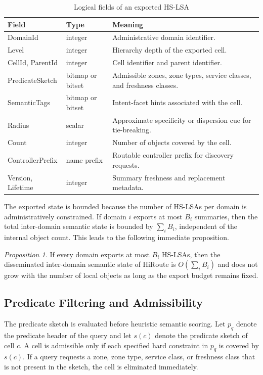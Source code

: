 \documentclass[journal]{IEEEtran}
\newcommand{\sysname}{HiRoute}
\newcommand{\hslsa}{HS-LSA}
\begin{document}
\begin{table}[t]
\caption{Logical fields of an exported \hslsa{}}
\label{tab:hslsa}
\centering
\begin{tabularx}{\columnwidth}{@{}>{\raggedright\arraybackslash}p{2.0cm} >{\raggedright\arraybackslash}p{1.2cm} X@{}}
\toprule
Field & Type & Meaning \\
\midrule
DomainId & integer & Administrative domain identifier. \\
Level & integer & Hierarchy depth of the exported cell. \\
CellId, ParentId & integer & Cell identifier and parent identifier. \\
PredicateSketch & bitmap or bitset & Admissible zones, zone types, service classes, and freshness classes. \\
SemanticTags & bitmap or bitset & Intent-facet hints associated with the cell. \\
Radius & scalar & Approximate specificity or dispersion cue for tie-breaking. \\
Count & integer & Number of objects covered by the cell. \\
ControllerPrefix & name prefix & Routable controller prefix for discovery requests. \\
Version, Lifetime & integer & Summary freshness and replacement metadata. \\
\bottomrule
\end{tabularx}
\end{table}

The exported state is bounded because the number of \hslsa{}s per domain is administratively constrained. If domain $i$ exports at most $B_i$ summaries, then the total inter-domain semantic state is bounded by $\sum_i B_i$, independent of the internal object count. This leads to the following immediate proposition.

\textit{Proposition 1.} If every domain exports at most $B_i$ \hslsa{}s, then the disseminated inter-domain semantic state of \sysname{} is $O\!\left(\sum_i B_i\right)$ and does not grow with the number of local objects as long as the export budget remains fixed.

\subsection{Predicate Filtering and Admissibility}

The predicate sketch is evaluated before heuristic semantic scoring. Let $p_q$ denote the predicate header of the query and let $s(c)$ denote the predicate sketch of cell $c$. A cell is admissible only if each specified hard constraint in $p_q$ is covered by $s(c)$. If a query requests a zone, zone type, service class, or freshness class that is not present in the sketch, the cell is eliminated immediately.
\end{document}
